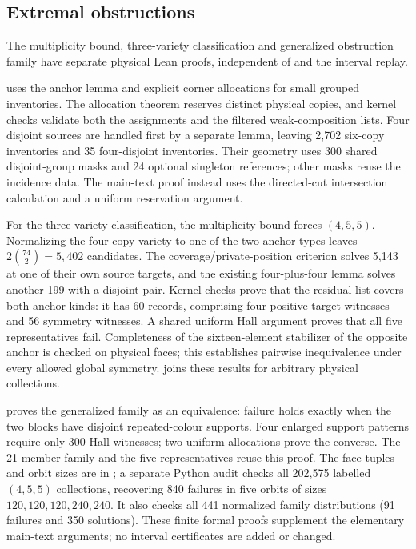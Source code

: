\subsection{Extremal obstructions}\label{app:extremal}
The multiplicity bound, three-variety classification and generalized
obstruction family have separate physical Lean proofs, independent of
 and the interval replay.

 uses the anchor lemma and explicit corner
allocations for small grouped inventories. The allocation theorem reserves
distinct physical copies, and kernel checks validate both the assignments
and the filtered weak-composition lists. Four disjoint sources are handled
first by a separate lemma, leaving 2,702 six-copy inventories and 35
four-disjoint inventories. Their geometry uses 300 shared disjoint-group
masks and 24 optional singleton references; other masks reuse the incidence
data. The main-text proof instead uses the directed-cut intersection
calculation and a uniform reservation argument.

For the three-variety classification, the multiplicity bound forces
$(4,5,5)$. Normalizing the four-copy variety to one of the two anchor types
leaves $2\binom{74}{2}=5,402$ candidates. The coverage/private-position
criterion solves 5,143 at one of their own source targets, and the existing
four-plus-four lemma solves another 199 with a disjoint pair. Kernel checks
prove that the residual list covers both anchor kinds: it has 60 records,
comprising four positive target witnesses and 56 symmetry witnesses. A shared uniform Hall
argument proves that all five representatives fail. Completeness of the
sixteen-element stabilizer of the opposite anchor is checked on physical
faces; this establishes pairwise inequivalence under every allowed global
symmetry.  joins these results for arbitrary
physical collections.

 proves the generalized
family as an equivalence: failure holds exactly when the two blocks have
disjoint repeated-colour supports. Four enlarged support patterns require
only 300 Hall witnesses; two uniform allocations prove the converse. The
21-member family and the five representatives reuse this proof.
The face tuples and orbit sizes are in
; a separate Python audit checks all
202,575 labelled $(4,5,5)$ collections, recovering 840 failures in five
orbits of sizes $120,120,120,240,240$. It also checks all 441 normalized
family distributions (91 failures and 350 solutions).
These finite formal proofs supplement the elementary main-text arguments;
no interval certificates are added or changed.

